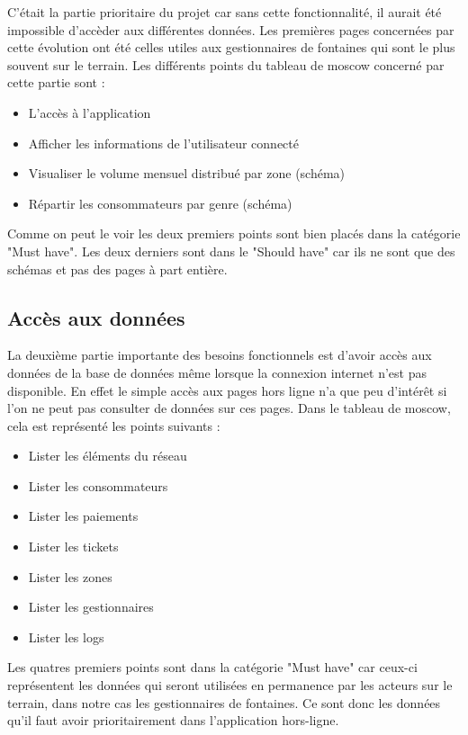 \documentclass{EPL-master-thesis-covers-FR}
\begin{document}
				C'était la partie prioritaire du projet car sans cette fonctionnalité, il aurait été impossible d'accèder aux différentes données. Les premières pages concernées par cette évolution ont été celles utiles aux gestionnaires de fontaines qui sont le plus souvent sur le terrain.
				Les différents points du tableau de moscow concerné par cette partie sont :
				\begin{itemize}
					\item L'accès à l'application
					\item Afficher les informations de l'utilisateur connecté
					\item Visualiser le volume mensuel distribué par zone (schéma)
					\item Répartir les consommateurs par genre (schéma)
				\end{itemize}
				
				Comme on peut le voir les deux premiers points sont bien placés dans la catégorie "Must have". Les deux derniers sont dans le "Should have" car ils ne sont que des schémas et pas des pages à part entière.
				
			\subsection*{Accès aux données}
				La deuxième partie importante des besoins fonctionnels est d'avoir accès aux données de la base de données même lorsque la connexion internet n'est pas disponible. En effet le simple accès aux pages hors ligne n'a que peu d'intérêt si l'on ne peut pas consulter de données sur ces pages.
			Dans le tableau de moscow, cela est représenté les points suivants :
				\begin{itemize}
					\item Lister les éléments du réseau
					\item Lister les consommateurs
					\item Lister les paiements
					\item Lister les tickets
					\item Lister les zones
					\item Lister les gestionnaires
					\item Lister les logs
				\end{itemize}
				
				Les quatres premiers points sont dans la catégorie "Must have" car ceux-ci représentent les données qui seront utilisées en permanence par les acteurs sur le terrain, dans notre cas les gestionnaires de fontaines. Ce sont donc les données qu'il faut avoir prioritairement dans l'application hors-ligne.
				
\end{document}
